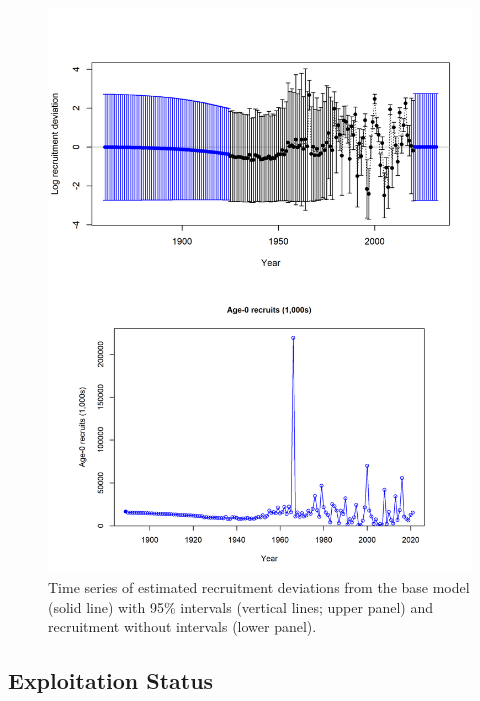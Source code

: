 \documentclass[11pt,
  english,
  a4paper,
]{article}
\begin{document}
\leavevmode\tagmcend\tagstructend\par


\begin{figure}
\centering
\includegraphics[width=1\textwidth,height=1\textheight]{figs/rec_panel.png}
\caption{Time series of estimated recruitment deviations from the base model (solid line) with 95\% intervals (vertical lines; upper panel) and recruitment without intervals (lower panel).}
\end{figure}

\tagmcend\tagstructend

\clearpage


\hypertarget{exploitation-status}{%
\subsection*{Exploitation Status}\label{exploitation-status}}
\end{document}
